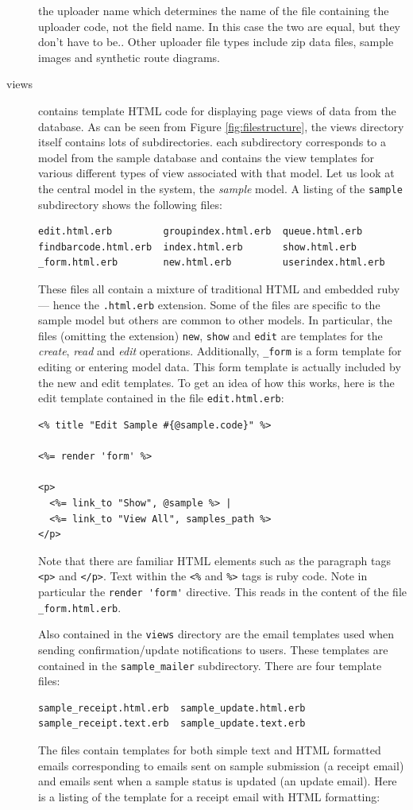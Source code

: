 \documentclass[12pt,twoside]{article}
\begin{document}
\begin{description}
{the uploader name which determines the name of the file containing the
uploader code, not the field name. In this case the two are equal, but
they don't have to be.}.
Other uploader file types include zip data files, sample images and
synthetic route diagrams.
\item[views]
contains template HTML code for displaying page views of data from the
database. As can be seen from Figure \ref{fig:filestructure}, the views
directory itself contains lots of subdirectories. each subdirectory
corresponds to a model from the sample database and contains the view
templates for various different types of view associated with that model.
Let us look at the central model in the system, the \emph{sample} model.
A listing of the \verb=sample= subdirectory shows the following files:
\begin{verbatim}
edit.html.erb         groupindex.html.erb  queue.html.erb
findbarcode.html.erb  index.html.erb       show.html.erb
_form.html.erb        new.html.erb         userindex.html.erb
\end{verbatim}
These files all contain a mixture of traditional HTML and embedded ruby
--- hence the \verb=.html.erb= extension. Some of the files are specific
to the sample model but others are common to other models. In particular,
the files (omitting the extension) \verb=new=, \verb=show= and \verb=edit=
are templates for the \emph{create}, \emph{read} and
\emph{edit} operations.
Additionally, \verb=_form= is a form template for editing or entering 
model data. This form template is actually included by the new and edit
templates.
To get an idea of how this works, here is the edit template contained
in the file \verb=edit.html.erb=:

\scriptsize
\begin{verbatim}
<% title "Edit Sample #{@sample.code}" %>

<%= render 'form' %>

<p>
  <%= link_to "Show", @sample %> |
  <%= link_to "View All", samples_path %>
</p>
\end{verbatim}
\normalsize

Note that there are familiar HTML elements such as the paragraph tags
\verb=<p>= and \verb=</p>=. Text within the \verb=<%= and \verb=%>=
tags is ruby code. Note in particular the \verb=render 'form'= directive.
This reads in the content of the file \verb=_form.html.erb=.

Also contained in the \verb=views= directory are the email templates used
when sending confirmation/update notifications to users. These 
templates are contained in the \verb=sample_mailer= subdirectory.
There are four template files:
\begin{verbatim}
sample_receipt.html.erb  sample_update.html.erb
sample_receipt.text.erb  sample_update.text.erb
\end{verbatim}
The files contain templates for both simple text and HTML formatted emails
corresponding to emails sent on sample submission (a receipt email)
and emails sent when a sample status is updated (an update email).
Here is a listing of the template for a receipt email with HTML
formatting:


\end{description}
\end{document}
